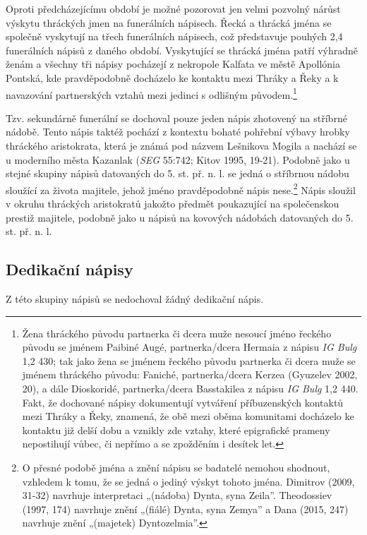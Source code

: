 Oproti předcházejícímu období je možné pozorovat jen velmi pozvolný nárůst výskytu thráckých jmen na funerálních nápisech. Řecká a thrácká jména se společně vyskytují na třech funerálních nápisech, což představuje pouhých 2,4  funerálních nápisů z daného období. Vyskytující se thrácká jména patří výhradně ženám a všechny tři nápisy pocházejí z nekropole Kalfata ve městě Apollónia Pontská, kde pravděpodobně docházelo ke kontaktu mezi Thráky a Řeky a k navazování partnerských vztahů mezi jedinci s odlišným původem.\footnote{Žena thráckého původu partnerka či dcera muže nesoucí jméno řeckého původu se jménem Paibiné Augé, partnerka/dcera Hermaia z nápisu {\em IG Bulg} 1,2 430; tak jako žena se jménem řeckého původu partnerka či dcera muže se jménem thráckého původu: Faniché, partnerka/dcera Kerzea (Gyuzelev 2002, 20), a dále Dioskoridé, partnerka/dcera Basstakilea z nápisu {\em IG Bulg} 1,2 440. Fakt, že dochované nápisy dokumentují vytváření příbuzenských kontaktů mezi Thráky a Řeky, znamená, že obě mezi oběma komunitami docházelo ke kontaktu již delší dobu a vznikly zde vztahy, které epigrafické prameny nepostihují vůbec, či nepřímo a se zpožděním i desítek let.}

Tzv. sekundárně funerální se dochoval pouze jeden nápis zhotovený na stříbrné nádobě. Tento nápis taktéž pochází z kontextu bohaté pohřební výbavy hrobky thráckého aristokrata, která je známá pod názvem Lešnikova Mogila a nachází se u moderního města Kazanlak ({\em SEG} 55:742; Kitov 1995, 19-21). Podobně jako u stejné skupiny nápisů datovaných do 5. st. př. n. l. se jedná o stříbrnou nádobu sloužící za života majitele, jehož jméno pravděpodobně nápis nese.\footnote{O přesné podobě jména a znění nápisu se badatelé nemohou shodnout, vzhledem k tomu, že se jedná o jediný výskyt tohoto jména. Dimitrov (2009, 31-32) navrhuje interpretaci „(nádoba) Dynta, syna Zeila”. Theodossiev (1997, 174) navrhuje znění „(fiálé) Dynta, syna Zemya” a Dana (2015, 247) navrhuje znění „(majetek) Dyntozelmia”.} Nápis sloužil v okruhu thráckých aristokratů jakožto předmět poukazující na společenskou prestiž majitele, podobně jako u nápisů na kovových nádobách datovaných do 5. st. př. n. l.

\subsection[dedikační-nápisy-2]{Dedikační nápisy}

Z této skupiny nápisů se nedochoval žádný dedikační nápis.

